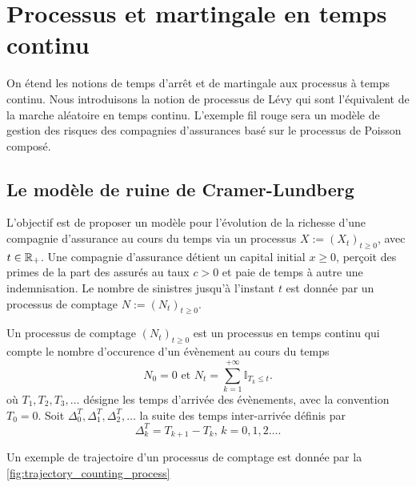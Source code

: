 \chapter{Processus et martingale en temps continu}\label{chap:processus_levy}
On étend les notions de temps d'arrêt et de martingale aux processus à temps continu. Nous introduisons la notion de processus de Lévy qui sont l'équivalent de la marche aléatoire en temps continu. L'exemple fil rouge sera un modèle de gestion des risques des compagnies d'assurances basé sur le processus de Poisson composé. 
\section{Le modèle de ruine de Cramer-Lundberg}\label{sec:cramer-lundberg}
L'objectif est de proposer un modèle pour l'évolution de la richesse d'une compagnie d'assurance au cours du temps via un processus $X:=(X_t)_{t\geq0}$, avec $t\in\mathbb{R}_+$. Une compagnie d'assurance détient un capital initial $x\geq0$, perçoit des primes de la part des assurés au taux $c>0$ et paie de temps à autre une indemnisation. Le nombre de sinistres jusqu'à l'instant $t$ est donnée par un processus de comptage $N:=(N_t)_{t\geq0}$. 
\begin{definition}\label{def:counting_process}
Un processus de comptage $(N_t)_{t\geq0}$ est un processus en temps continu qui compte le nombre d'occurence d'un évènement au cours du temps
\begin{equation*}
N_0=0\text{ et }N_t=\sum_{k=1}^{+\infty}\mathbb{I}_{T_k\leq t}.
\end{equation*}
où $T_1,T_2,T_3,\ldots$ désigne les temps d'arrivée des évènements, avec la convention $T_0=0$. Soit $\Delta^T_0,\Delta^T_1,\Delta^T_2,\ldots$ la suite des temps inter-arrivée définis par
$$
\Delta^T_k=T_{k+1}-T_{k}\text{, }k=0,1,2\ldots.
$$
\end{definition}
Un exemple de trajectoire d'un processus de comptage est donnée par la \cref{fig:trajectory_counting_process}
